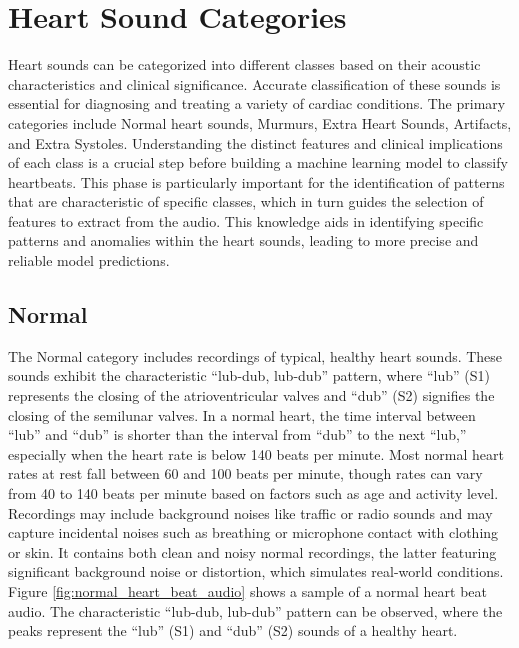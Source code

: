 \section{Heart Sound Categories}
Heart sounds can be categorized into different classes based on their acoustic characteristics and clinical significance.
Accurate classification of these sounds is essential for diagnosing and treating a variety of cardiac conditions.
The primary categories include Normal heart sounds, Murmurs, Extra Heart Sounds, Artifacts, and Extra Systoles.
Understanding the distinct features and clinical implications of each class is a crucial step before building a
machine learning model to classify heartbeats.
This phase is particularly important for the identification of patterns that are characteristic of specific classes,
which in turn guides the selection of features to extract from the audio.
This knowledge aids in identifying specific patterns and anomalies within the heart sounds,
leading to more precise and reliable model predictions.
\subsection{Normal}
The Normal category includes recordings of typical, healthy heart sounds. These sounds exhibit the characteristic ``lub-dub, lub-dub'' pattern,
where ``lub'' (S1) represents the closing of the atrioventricular valves and ``dub'' (S2) signifies the closing of the semilunar valves.
In a normal heart, the time interval between ``lub'' and ``dub'' is shorter than the interval from ``dub'' to the next ``lub,''
especially when the heart rate is below 140 beats per minute. Most normal heart rates at rest fall between 60 and 100 beats per minute,
though rates can vary from 40 to 140 beats per minute based on factors such as age and activity level.
Recordings may include background noises like traffic or radio sounds and may capture incidental noises such as breathing or microphone
contact with clothing or skin. It contains both clean and noisy normal recordings,
the latter featuring significant background noise or distortion, which simulates real-world conditions.\\
Figure \ref{fig:normal_heart_beat_audio} shows a sample of a normal heart beat audio.
The characteristic ``lub-dub, lub-dub'' pattern can be observed, where the peaks represent the ``lub'' (S1) and ``dub'' (S2) sounds of a healthy heart.

